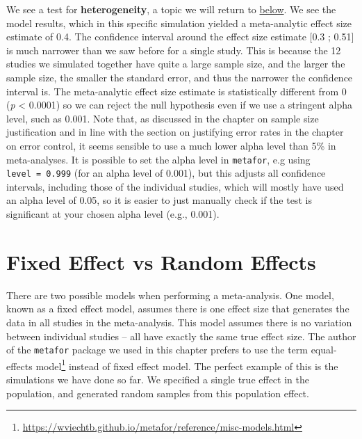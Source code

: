 \documentclass[
  oneside]{krantz}
\renewcommand{\href}[2]{#2\footnote{\url{#1}}}
\begin{document}
We see a test for \textbf{heterogeneity}, a topic we will return to \protect\hyperlink{heterogeneity}{below}. We see the model results, which in this specific simulation yielded a meta-analytic effect size estimate of 0.4. The confidence interval around the effect size estimate {[}0.3 ; 0.51{]} is much narrower than we saw before for a single study. This is because the 12 studies we simulated together have quite a large sample size, and the larger the sample size, the smaller the standard error, and thus the narrower the confidence interval is. The meta-analytic effect size estimate is statistically different from 0 (\emph{p} \textless{} 0.0001) so we can reject the null hypothesis even if we use a stringent alpha level, such as 0.001. Note that, as discussed in the chapter on sample size justification and in line with the section on justifying error rates in the chapter on error control, it seems sensible to use a much lower alpha level than 5\% in meta-analyses. It is possible to set the alpha level in \texttt{metafor}, e.g using \texttt{level\ =\ 0.999} (for an alpha level of 0.001), but this adjusts all confidence intervals, including those of the individual studies, which will mostly have used an alpha level of 0.05, so it is easier to just manually check if the test is significant at your chosen alpha level (e.g., 0.001).

\hypertarget{fixed-effect-vs-random-effects}{%
\section{Fixed Effect vs Random Effects}\label{fixed-effect-vs-random-effects}}

There are two possible models when performing a meta-analysis. One model, known as a fixed effect model, assumes there is one effect size that generates the data in all studies in the meta-analysis. This model assumes there is no variation between individual studies -- all have exactly the same true effect size. The author of the \texttt{metafor} package we used in this chapter prefers to use the term \href{https://wviechtb.github.io/metafor/reference/misc-models.html}{equal-effects model} instead of fixed effect model. The perfect example of this is the simulations we have done so far. We specified a single true effect in the population, and generated random samples from this population effect.
\end{document}
